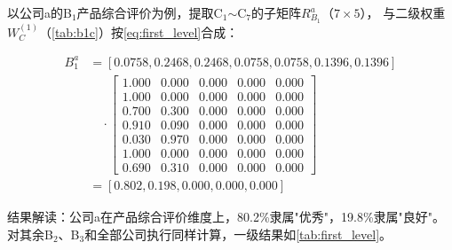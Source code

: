 \documentclass[a4paper,12pt]{ctexart}
\begin{document}
以公司a的B$_1$产品综合评价为例，提取C$_1$$\sim$C$_7$的子矩阵$R_{B_1}^a$（$7\times 5$），
与二级权重$W_C^{(1)}$（\cref{tab:b1c}）按\cref{eq:first_level}合成：

\begin{align}
B_1^{a} &= [0.0758, 0.2468, 0.2468, 0.0758, 0.0758, 0.1396, 0.1396] \nonumber \\
        &\quad \cdot \begin{bmatrix}
        1.000&0.000&0.000&0.000&0.000 \\
        1.000&0.000&0.000&0.000&0.000 \\
        0.700&0.300&0.000&0.000&0.000 \\
        0.910&0.090&0.000&0.000&0.000 \\
        0.030&0.970&0.000&0.000&0.000 \\
        1.000&0.000&0.000&0.000&0.000 \\
        0.690&0.310&0.000&0.000&0.000
        \end{bmatrix} \nonumber \\
        &= [0.802, 0.198, 0.000, 0.000, 0.000]
\label{eq:b1}
\end{align}

结果解读：公司a在产品综合评价维度上，80.2\%隶属"优秀"，19.8\%隶属"良好"。
对其余B$_2$、B$_3$和全部公司执行同样计算，一级结果如\cref{tab:first_level}。
\end{document}
